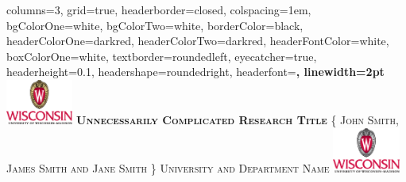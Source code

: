\documentclass[landscape,a0paper,fontscale=0.285]{baposter}
\begin{document}
\begin{poster}
{
columns=3,
grid=true,
headerborder=closed, %
colspacing=1em, %
bgColorOne=white, %
bgColorTwo=white, %
borderColor=black, %
headerColorOne=darkred, %
headerColorTwo=darkred, %
headerFontColor=white, %
boxColorOne=white, %
textborder=roundedleft, %
eyecatcher=true, %
headerheight=0.1\textheight, %
headershape=roundedright, %
headerfont=\Large\bf\textsc, %
linewidth=2pt %
}
%
{\includegraphics[height=4em]{UWlogo_warm.eps}} %
{\bf\textsc{Unnecessarily Complicated Research Title}\vspace{0.5em}} %
{\textsc{\{ John Smith, James Smith and Jane Smith \} \hspace{12pt} University and Department Name}} %
{\includegraphics[height=4em]{UWlogo_cool.eps}} %



\end{poster}
\end{document}
